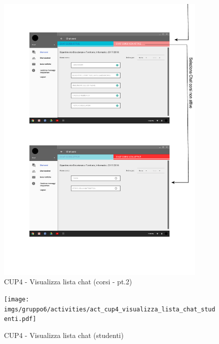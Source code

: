 \begin{figure}
	\centering
	\includegraphics[width=0.9\textwidth]{imgs/gruppo6/activities/act_cup4_visualizza_lista_chat_corsi2.pdf}
	\caption{CUP4 - Visualizza lista chat (corsi - pt.2)}
	\label{fig:act-cup4-2}
\end{figure}

\begin{figure}
	\centering
	\texttt{[image: imgs/gruppo6/activities/act\_cup4\_visualizza\_lista\_chat\_studenti.pdf]}
	\caption{CUP4 - Visualizza lista chat (studenti)}
	\label{fig:act-cup4-3}
\end{figure}

